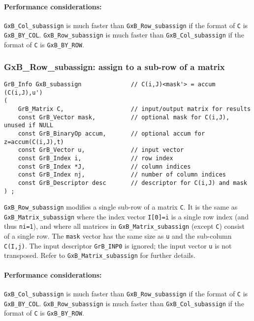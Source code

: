 \documentclass[12pt]{article}
\begin{document}
\paragraph{\bf Performance considerations:} %
\verb'GxB_Col_subassign' is much faster than \verb'GxB_Row_subassign' if the
format of \verb'C' is \verb'GxB_BY_COL'.  \verb'GxB_Row_subassign' is much
faster than \verb'GxB_Col_subassign' if the format of \verb'C' is
\verb'GxB_BY_ROW'.

\subsubsection{{\sf GxB\_Row\_subassign:} assign to a sub-row of a matrix}
\label{subassign_row}

\begin{mdframed}[userdefinedwidth=6in]
{\footnotesize
\begin{verbatim}
GrB_Info GxB_subassign              // C(i,J)<mask'> = accum (C(i,J),u')
(
    GrB_Matrix C,                   // input/output matrix for results
    const GrB_Vector mask,          // optional mask for C(i,J), unused if NULL
    const GrB_BinaryOp accum,       // optional accum for z=accum(C(i,J),t)
    const GrB_Vector u,             // input vector
    const GrB_Index i,              // row index
    const GrB_Index *J,             // column indices
    const GrB_Index nj,             // number of column indices
    const GrB_Descriptor desc       // descriptor for C(i,J) and mask
) ;
\end{verbatim} } \end{mdframed}

\verb'GxB_Row_subassign' modifies a single sub-row of a matrix \verb'C'.  It is
the same as \verb'GxB_Matrix_subassign' where the index vector \verb'I[0]=i' is
a single row index (and thus \verb'ni=1'), and where all matrices in
\verb'GxB_Matrix_subassign' (except \verb'C') consist of a single row.  The
\verb'mask' vector has the same size as \verb'u' and the sub-column
\verb'C(I,j)'.  The input descriptor \verb'GrB_INP0' is ignored; the input
vector \verb'u' is not transposed.  Refer to \verb'GxB_Matrix_subassign' for
further details.

\paragraph{\bf Performance considerations:} %
\verb'GxB_Col_subassign' is much faster than \verb'GxB_Row_subassign' if the
format of \verb'C' is \verb'GxB_BY_COL'.  \verb'GxB_Row_subassign' is much
faster than \verb'GxB_Col_subassign' if the format of \verb'C' is
\verb'GxB_BY_ROW'.
\end{document}
